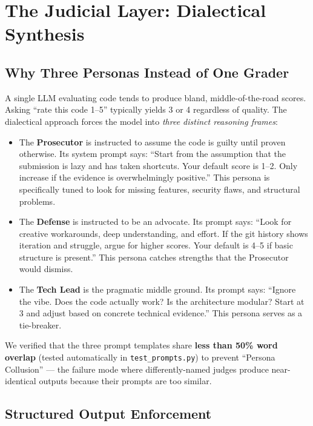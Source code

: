 \documentclass[12pt,a4paper]{article}
\begin{document}
\section{The Judicial Layer: Dialectical Synthesis}

\subsection{Why Three Personas Instead of One Grader}

A single LLM evaluating code tends to produce bland, middle-of-the-road scores. Asking ``rate this code 1--5'' typically yields 3 or 4 regardless of quality. The dialectical approach forces the model into \emph{three distinct reasoning frames}:

\begin{itemize}
  \item The \textbf{Prosecutor} is instructed to assume the code is guilty until proven otherwise. Its system prompt says: ``Start from the assumption that the submission is lazy and has taken shortcuts. Your default score is 1--2. Only increase if the evidence is overwhelmingly positive.'' This persona is specifically tuned to look for missing features, security flaws, and structural problems.

  \item The \textbf{Defense} is instructed to be an advocate. Its prompt says: ``Look for creative workarounds, deep understanding, and effort. If the git history shows iteration and struggle, argue for higher scores. Your default is 4--5 if basic structure is present.'' This persona catches strengths that the Prosecutor would dismiss.

  \item The \textbf{Tech Lead} is the pragmatic middle ground. Its prompt says: ``Ignore the vibe. Does the code actually work? Is the architecture modular? Start at 3 and adjust based on concrete technical evidence.'' This persona serves as a tie-breaker.
\end{itemize}

We verified that the three prompt templates share \textbf{less than 50\% word overlap} (tested automatically in \texttt{test\_prompts.py}) to prevent ``Persona Collusion'' --- the failure mode where differently-named judges produce near-identical outputs because their prompts are too similar.

\subsection{Structured Output Enforcement}
\end{document}
